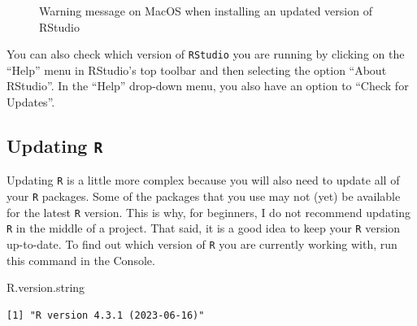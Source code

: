 \documentclass[
  letterpaper,
  DIV=11,
  numbers=noendperiod]{scrreprt}
\newenvironment{Shaded}{\begin{snugshade}}{\end{snugshade}}
\newcommand{\NormalTok}[1]{\textcolor[rgb]{0.00,0.23,0.31}{#1}}
\begin{document}
\begin{figure}


\caption{\label{fig-UpdateRStudio}Warning message on MacOS when
installing an updated version of RStudio}

\end{figure}%

You can also check which version of \texttt{RStudio} you are running by
clicking on the ``Help'' menu in RStudio's top toolbar and then
selecting the option ``About RStudio''. In the ``Help'' drop-down menu,
you also have an option to ``Check for Updates''.

\subsection{\texorpdfstring{Updating
\texttt{R}}{Updating R}}\label{updating-r}

Updating \texttt{R} is a little more complex because you will also need
to update all of your \texttt{R} packages. Some of the packages that you
use may not (yet) be available for the latest \texttt{R} version. This
is why, for beginners, I do not recommend updating \texttt{R} in the
middle of a project. That said, it is a good idea to keep your
\texttt{R} version up-to-date. To find out which version of \texttt{R}
you are currently working with, run this command in the Console.

\begin{Shaded}
\begin{Highlighting}[]
\NormalTok{R.version.string}
\end{Highlighting}
\end{Shaded}

\begin{verbatim}
[1] "R version 4.3.1 (2023-06-16)"
\end{verbatim}
\end{document}
